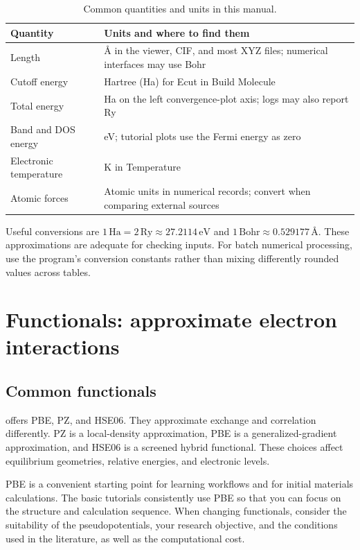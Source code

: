 \begin{table}[htbp]
\centering
\caption{Common quantities and units in this manual.}
\begin{tabularx}{\linewidth}{lX}
\toprule
Quantity & Units and where to find them\\
\midrule
Length & Å in the viewer, CIF, and most XYZ files; numerical interfaces may use Bohr\\
Cutoff energy & Hartree (Ha) for Ecut in Build Molecule\\
Total energy & Ha on the left convergence-plot axis; logs may also report Ry\\
Band and DOS energy & eV; tutorial plots use the Fermi energy as zero\\
Electronic temperature & K in Temperature\\
Atomic forces & Atomic units in numerical records; convert when comparing external sources\\
\bottomrule
\end{tabularx}
\end{table}

Useful conversions are $1\,\mathrm{Ha}=2\,\mathrm{Ry}\approx27.2114\,\mathrm{eV}$ and $1\,\mathrm{Bohr}\approx0.529177\,\text{Å}$. These approximations are adequate for checking inputs. For batch numerical processing, use the program's conversion constants rather than mixing differently rounded values across tables.

\section{Functionals: approximate electron interactions}

\subsection{Common functionals}

 offers PBE, PZ, and HSE06. They approximate exchange and correlation differently. PZ is a local-density approximation, PBE is a generalized-gradient approximation, and HSE06 is a screened hybrid functional. These choices affect equilibrium geometries, relative energies, and electronic levels.

PBE is a convenient starting point for learning workflows and for initial materials calculations. The basic tutorials consistently use PBE so that you can focus on the structure and calculation sequence. When changing functionals, consider the suitability of the pseudopotentials, your research objective, and the conditions used in the literature, as well as the computational cost.

